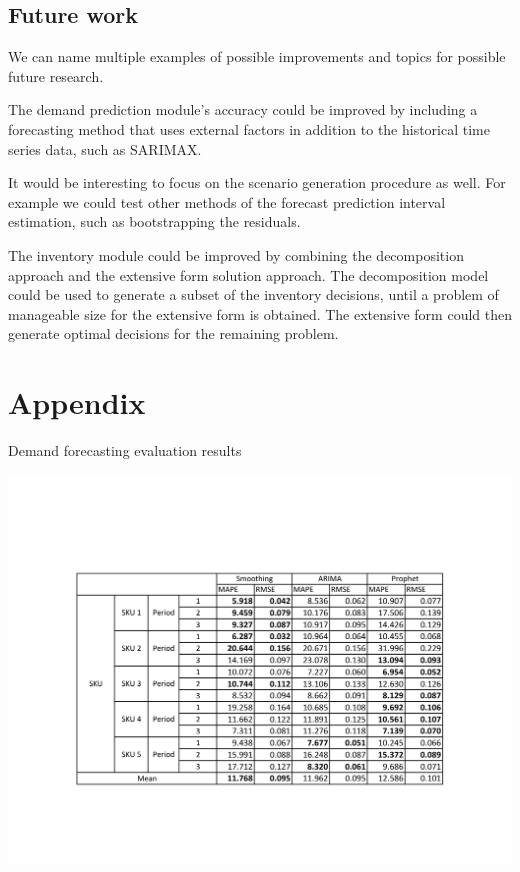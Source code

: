 \documentclass[11pt,a4paper]{article}
\begin{document}
\subsection{Future work}
We can name multiple examples of possible improvements and topics for possible future research.  

The demand prediction module's accuracy could be improved by including a forecasting method that uses external factors in addition to the historical time series data, such as SARIMAX. 

It would be interesting to focus on the scenario generation procedure as well. For example we could test other methods of the forecast prediction interval estimation, such as bootstrapping the residuals.

The inventory module could be improved by combining the decomposition approach and the extensive form solution approach. The decomposition model could be used to generate a subset of the inventory decisions, until a problem of manageable size for the extensive form is obtained. The extensive form could then generate optimal decisions for the remaining problem. 

\newpage
\section{Appendix}
\label{sec:appendix}
\begin{table}
  \caption{Demand forecasting evaluation results}
  \label{tbl:dem_bench}
  \includegraphics[angle=270,origin=c,width=1.3\textwidth]{figures/experiments1.pdf}
\end{table}
\end{document}
